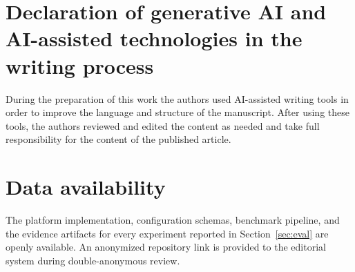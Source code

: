 \documentclass[review,12pt,a4paper]{elsarticle}
\begin{document}









\section*{Declaration of generative AI and AI-assisted technologies in the
writing process}
During the preparation of this work the authors used AI-assisted writing
tools in order to improve the language and structure of the manuscript.
After using these tools, the authors reviewed and edited the content as
needed and take full responsibility for the content of the published
article.

\section*{Data availability}
The platform implementation, configuration schemas, benchmark pipeline, and
the evidence artifacts for every experiment reported in Section~\ref{sec:eval}
are openly available. An anonymized repository link is provided to the
editorial system during double-anonymous review.




\end{document}
